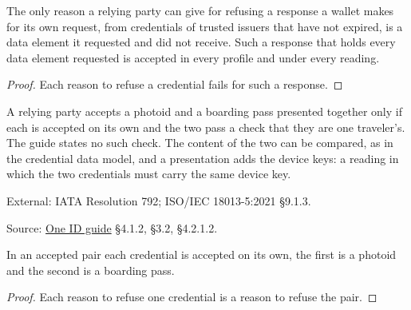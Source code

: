 \begin{theorem}
  \label{thm:wallet-response-accepted}
  The only reason a relying party can give for refusing a response a wallet
  makes for its own request, from credentials of trusted issuers that have not
  expired, is a data element it requested and did not receive.  Such a
  response that holds every data element requested is accepted in every
  profile and under every reading.
\end{theorem}
\begin{proof}
  Each reason to refuse a credential fails for such a response.
\end{proof}

\begin{definition}
  \label{def:pair}
  A relying party accepts a photoid and a boarding pass presented together only
  if each is accepted on its own and the two pass a check that they are one
  traveler's.  The guide states no such check.  The content of the two can be
  compared, as in the credential data model, and a presentation adds the device
  keys: a reading in which the two credentials must carry the same device key.

  External: IATA Resolution 792; ISO/IEC 18013-5:2021 §9.1.3.

  Source: \href{https://standards.atlassian.net/wiki/spaces/OneID/pages/2947416082/Technical+Implementation+Guide}{One ID guide} §4.1.2, §3.2, §4.2.1.2.
\end{definition}

\begin{theorem}
  \label{thm:pair-each-accepted}
  In an accepted pair each credential is accepted on its own, the first is a
  photoid and the second is a boarding pass.
\end{theorem}
\begin{proof}
  Each reason to refuse one credential is a reason to refuse the pair.
\end{proof}

